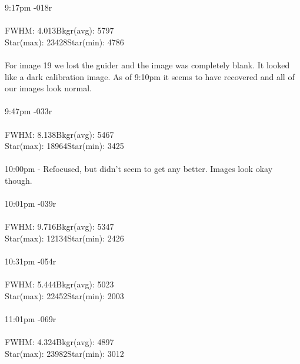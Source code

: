 \documentclass[11pt]{report}
\begin{document}
9:17pm -\hspace{97pt}018r \\ \\
FWHM: 4.013\hspace{70pt}Bkgr(avg): 5797 \\
Star(max): 23428\hspace{55pt}Star(min): 4786\\ \\
For image 19 we lost the guider and the image was completely blank. It looked like a dark calibration image. As of 9:10pm it seems to have recovered and all of our images look normal. \\ \\
9:47pm -\hspace{97pt}033r \\ \\
FWHM: 8.138\hspace{70pt}Bkgr(avg): 5467 \\
Star(max): 18964\hspace{55pt}Star(min): 3425\\ \\
10:00pm - Refocused, but didn't seem to get any better. Images look okay though. \\ \\
10:01pm -\hspace{97pt}039r \\ \\
FWHM: 9.716\hspace{70pt}Bkgr(avg): 5347 \\
Star(max): 12134\hspace{55pt}Star(min): 2426\\ \\
10:31pm -\hspace{97pt}054r \\ \\
FWHM: 5.444\hspace{70pt}Bkgr(avg): 5023 \\
Star(max): 22452\hspace{55pt}Star(min): 2003\\ \\
11:01pm -\hspace{97pt}069r \\ \\
FWHM: 4.324\hspace{70pt}Bkgr(avg): 4897 \\
Star(max): 23982\hspace{55pt}Star(min): 3012\\ \\
\end{document}
